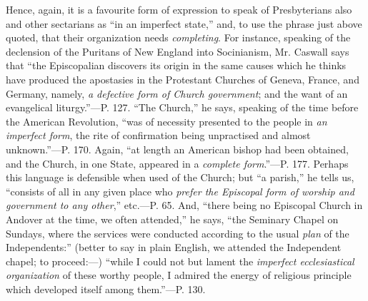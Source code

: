 Hence, again, it is a favourite form of
expression to speak of Presbyterians also and other sectarians as ``in
an imperfect state,'' and, to use the phrase just above quoted, that
their organization needs \emph{completing}. For instance, speaking of
the declension of the Puritans of New England into Socinianism, Mr.
Caswall says that ``the Episcopalian discovers its origin in the same
causes which he thinks have produced the apostasies in the Protestant
Churches of Geneva, France, and Germany, namely, \emph{a defective form
of Church government}; and the want of an evangelical liturgy.''—P.
127. ``The Church,'' he says, speaking of the time before the American
Revolution, ``was of necessity presented to the people in \emph{an
imperfect form}, the rite of confirmation being unpractised and
almost unknown.''—P. 170. Again, ``at length an American bishop had
been obtained, and the Church, in one State, appeared in a \emph{complete
form}.''—P. 177. Perhaps this language is defensible when used of
the Church; but ``a parish,'' he tells us, ``consists of all in any given
place who \emph{prefer the Episcopal form of worship and government to
any other},'' etc.—P. 65. And, ``there being no Episcopal Church in
Andover at the time, we often attended,'' he says, ``the Seminary Chapel
on Sundays, where the services were conducted according to the usual \emph{plan}
of the Independents:'' (better to say in plain English, we attended the
Independent chapel; to proceed:—) ``while I could not but lament the \emph{imperfect
ecclesiastical organization} of these worthy people, I admired
the energy of religious principle which developed itself among
them.''—P. 130.

